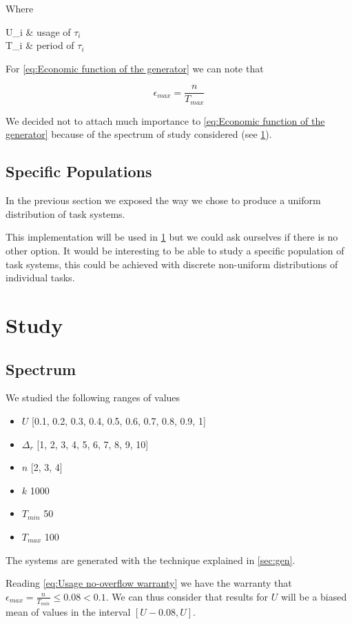 \documentclass[a4paper,12pt]{article}
\begin{document}
Where
\begin{conditions}
	U_i	&	usage of $\tau_i$ \\
	T_i	&	period of $\tau_i$
\end{conditions}

For \ref{eq:Economic function of the generator} we can note that

\begin{equation}
	\epsilon_{max} = \frac{n}{T_{max}}
	\label{eq:Usage shift maximum}
\end{equation}

We decided not to attach much importance to \ref{eq:Economic function of the generator} because of the spectrum of study considered (see \ref{sec:study}).
\subsection{Specific Populations}

In the previous section we exposed the way we chose to produce a uniform distribution of task systems.

This implementation will be used in \ref{sec:study} but we could ask ourselves if there is no other option.
It would be interesting to be able to study a specific population of task systems, this could be achieved with discrete non-uniform distributions of individual tasks.
\newpage\cleardoublepage{}
\section{Study}
\label{sec:study}
\subsection{Spectrum}

We studied the following ranges of values
\begin{itemize}
	\item{$U$} [0.1, 0.2, 0.3, 0.4, 0.5, 0.6, 0.7, 0.8, 0.9, 1]
	\item{$\Delta_r$} [1, 2, 3, 4, 5, 6, 7, 8, 9, 10]
	\item{$n$} [2, 3, 4]
	\item{$k$} 1000
	\item{$T_{min}$} 50
	\item{$T_{max}$} 100
\end{itemize}

The systems are generated with the technique explained in \ref{sec:gen}.

Reading \ref{eq:Usage no-overflow warranty} we have the warranty that $\epsilon_{max} = \frac{n}{T_{min}} \leq 0.08 < 0.1$.
We can thus consider that results for $U$ will be a biased mean of values in the interval $[U-0.08, U]$.
\end{document}
